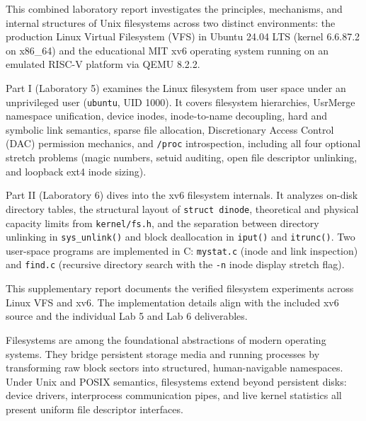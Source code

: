 \documentclass{assets/utmreport}
\begin{document}
\makeutmreporttitlepage
\tableofcontents
\clearpage

\begin{utmabstract}[Abstract]
This combined laboratory report investigates the principles, mechanisms, and internal structures of Unix filesystems across two distinct environments: the production Linux Virtual Filesystem (VFS) in Ubuntu 24.04 LTS (kernel 6.6.87.2 on x86\_64) and the educational MIT xv6 operating system running on an emulated RISC-V platform via QEMU 8.2.2.

Part I (Laboratory 5) examines the Linux filesystem from user space under an unprivileged user (\texttt{ubuntu}, UID 1000). It covers filesystem hierarchies, UsrMerge namespace unification, device inodes, inode-to-name decoupling, hard and symbolic link semantics, sparse file allocation, Discretionary Access Control (DAC) permission mechanics, and \texttt{/proc} introspection, including all four optional stretch problems (magic numbers, setuid auditing, open file descriptor unlinking, and loopback ext4 inode sizing).

Part II (Laboratory 6) dives into the xv6 filesystem internals. It analyzes on-disk directory tables, the structural layout of \texttt{struct dinode}, theoretical and physical capacity limits from \texttt{kernel/fs.h}, and the separation between directory unlinking in \texttt{sys\_unlink()} and block deallocation in \texttt{iput()} and \texttt{itrunc()}. Two user-space programs are implemented in C: \texttt{mystat.c} (inode and link inspection) and \texttt{find.c} (recursive directory search with the \texttt{-n} inode display stretch flag).
\end{utmabstract}

\utmintroduction
This supplementary report documents the verified filesystem experiments across Linux VFS and xv6. The implementation details align with the included xv6 source\cite{xv6} and the individual Lab 5 and Lab 6 deliverables.

Filesystems are among the foundational abstractions of modern operating systems. They bridge persistent storage media and running processes by transforming raw block sectors into structured, human-navigable namespaces. Under Unix and POSIX semantics, filesystems extend beyond persistent disks: device drivers, interprocess communication pipes, and live kernel statistics all present uniform file descriptor interfaces.
\end{document}
